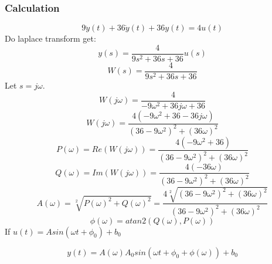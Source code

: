 \documentclass[12pt,a4paper,oneside]{ctexart}
\begin{document}
        \subsubsection{Calculation}
            $$9\ddot{y}(t) + 36\dot{y}(t) + 36y(t) = 4u(t)$$
            Do laplace transform get:
            $$y(s) = \frac{4}{9s^2+36s+36}u(s)$$
            $$W(s) = \frac{4}{9s^2+36s+36}$$
            Let $s = j\omega$.
            $$W(j\omega) = \frac{4}{-9\omega^2+36j\omega+36}$$
            $$W(j\omega) = \frac{4(-9\omega^2+36-36j\omega)}{(36-9\omega^2)^2+(36\omega)^2}$$
            $$P(\omega) = Re(W(j\omega)) = \frac{4(-9\omega^2+36)}{(36-9\omega^2)^2+(36\omega)^2}$$
            $$Q(\omega) = Im(W(j\omega)) = \frac{4(-36\omega)}{(36-9\omega^2)^2+(36\omega)^2}$$
            $$A(\omega) = \sqrt[2]{P(\omega)^2 + Q(\omega)^2} = \frac{4\sqrt[2]{(36-9\omega^2)^2+(36\omega)^2}}{(36-9\omega^2)^2+(36\omega)^2}$$
            $$\phi(\omega) = atan2(Q(\omega),P(\omega))$$
            If $u(t) = Asin(\omega t+\phi_0)+b_0$

            $$y(t) = A(\omega)A_0sin(\omega t + \phi_0 + \phi(\omega)) + b_0$$
\end{document}

